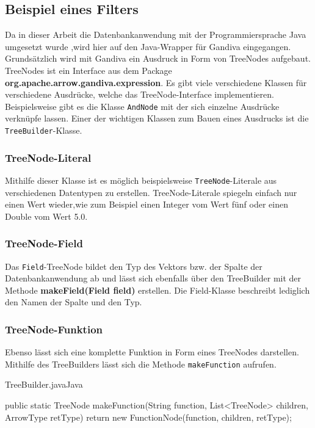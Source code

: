 \newpage

\subsection{Beispiel eines Filters}
\label{Beispiel eines Filters}

Da in dieser Arbeit die Datenbankanwendung mit der Programmiersprache Java umgesetzt wurde ,wird hier auf den Java-Wrapper für Gandiva eingegangen.\\
Grundsätzlich wird mit Gandiva ein Ausdruck in Form von TreeNodes aufgebaut. TreeNodes ist ein Interface aus dem Package \textbf{org.apache.arrow.gandiva.expression}. Es gibt viele verschiedene Klassen für verschiedene Ausdrücke, welche das TreeNode-Interface implementieren. 
Beispielsweise gibt es die Klasse \texttt{AndNode} mit der sich einzelne Ausdrücke verknüpfe lassen.
Einer der wichtigen Klassen zum Bauen eines Ausdrucks ist die \texttt{TreeBuilder}-Klasse.

\subsubsection{TreeNode-Literal}
Mithilfe dieser Klasse ist es möglich beispielsweise \texttt{TreeNode}-Literale aus verschiedenen Datentypen zu erstellen. TreeNode-Literale spiegeln einfach nur einen Wert wieder,wie zum Beispiel einen Integer vom Wert fünf oder einen Double vom Wert 5.0. \\

\subsubsection{TreeNode-Field}
Das \texttt{Field}-TreeNode bildet den Typ des Vektors bzw. der Spalte der Datenbankanwendung ab und lässt sich ebenfalls über den TreeBuilder mit der Methode \textbf{makeField(Field field)} erstellen.
Die Field-Klasse beschreibt lediglich den Namen der Spalte und den Typ.

\subsubsection{TreeNode-Funktion}
\label{TreeNode-Funktion}
Ebenso lässt sich eine komplette Funktion in Form eines TreeNodes darstellen.
Mithilfe des TreeBuilders lässt sich die Methode \texttt{makeFunction} aufrufen.

\begin{codeblock}{TreeBuilder.java}{Java}
  \begin{javacode}
    public static TreeNode makeFunction(String function, List<TreeNode> children, ArrowType retType) {
        return new FunctionNode(function, children, retType);
    }
  \end{javacode}
\end{codeblock}

